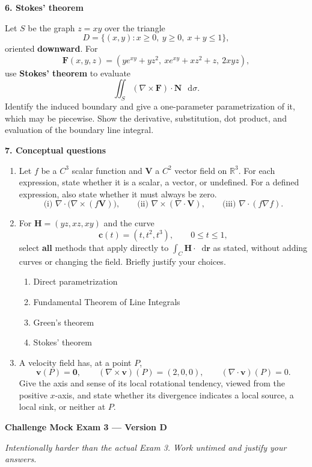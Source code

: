 \documentclass[11pt,letterpaper]{article}
\newcommand{\curl}{\nabla\times}
\newcommand{\dv}{\nabla\cdot}
\renewcommand{\vec}[1]{\mathbf{#1}}
\newcommand{\dd}{\mathop{}\!\mathrm{d}}
\newcommand{\grad}{\nabla}
\newcommand{\examproblem}[3]{%
  \par\medskip\Needspace{5\baselineskip}
  \noindent\textbf{#1. #2}\par\nobreak
}
\begin{document}
\examproblem{6}{Stokes' theorem}{20}
Let $S$ be the graph $z=xy$ over the triangle
\[
D=\{(x,y):x\geq0,\ y\geq0,\ x+y\leq1\},
\]
oriented \textbf{downward}. For
\[
\vec F(x,y,z)=
\left(ye^{xy}+yz^2,\ xe^{xy}+xz^2+z,\ 2xyz\right),
\]
use \textbf{Stokes' theorem} to evaluate
\[
\iint_S(\curl\vec F)\cdot\vec N\,\dd\sigma.
\]
Identify the induced boundary and give a one-parameter parametrization
of it, which may be piecewise. Show the derivative, substitution, dot
product, and evaluation of the boundary line integral.

\examproblem{7}{Conceptual questions}{14}
\begin{enumerate}[label=(\alph*)]
\item Let $f$ be a $C^3$ scalar function and $\vec V$
a $C^2$ vector field on $\mathbb R^3$. For each expression, state whether
it is a scalar, a vector, or undefined. For a defined expression, also
state whether it must always be zero.
\[
\text{(i) }\dv\bigl(\curl(f\vec V)\bigr),\qquad
\text{(ii) }\curl(\dv\vec V),\qquad
\text{(iii) }\dv(f\grad f).
\]

\item For $\vec H=(yz,xz,xy)$ and the curve
\[
\vec c(t)=(t,t^2,t^3),\qquad0\leq t\leq1,
\]
select \textbf{all} methods that apply directly to
$\displaystyle\int_C\vec H\cdot\dd\vec r$ as stated, without adding
curves or changing the field. Briefly justify your choices.
\begin{enumerate}[label=\Alph*.,itemsep=0pt,topsep=3pt]
\item Direct parametrization
\item Fundamental Theorem of Line Integrals
\item Green's theorem
\item Stokes' theorem
\end{enumerate}

\item A velocity field has, at a point $P$,
\[
\vec v(P)=\vec0,\qquad (\curl\vec v)(P)=(2,0,0),\qquad
(\dv\vec v)(P)=0.
\]
Give the axis and sense of its local rotational tendency, viewed from
the positive $x$-axis, and state whether its divergence indicates a
local source, a local sink, or neither at $P$.
\end{enumerate}

\clearpage
\setcounter{page}{1}
{\large\bfseries Challenge Mock Exam 3 --- Version D}
\smallskip

\textit{Intentionally harder than the actual Exam 3. Work untimed and
justify your answers.}
\end{document}
